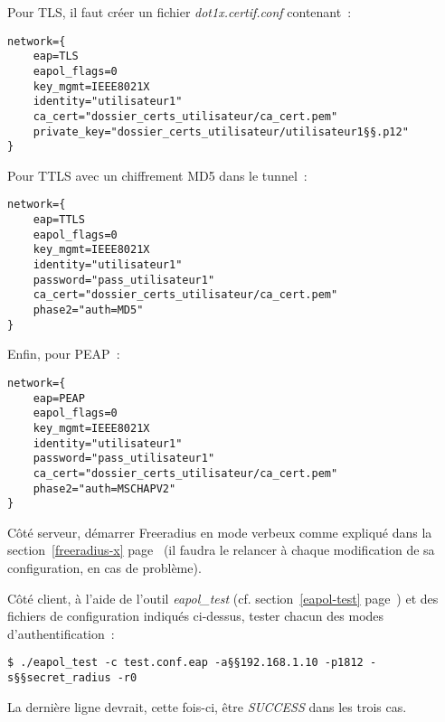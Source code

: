 Pour TLS, il faut créer un fichier \emph{dot1x.certif.conf} contenant~:

\begin{lstlisting}
network={
    eap=TLS
    eapol_flags=0
    key_mgmt=IEEE8021X
    identity="utilisateur1"
    ca_cert="dossier_certs_utilisateur/ca_cert.pem"
    private_key="dossier_certs_utilisateur/utilisateur1§§.p12"
}
\end{lstlisting}

%

Pour TTLS avec un chiffrement MD5 dans le tunnel~:

\begin{lstlisting}
network={
    eap=TTLS
    eapol_flags=0
    key_mgmt=IEEE8021X
    identity="utilisateur1"
    password="pass_utilisateur1"
    ca_cert="dossier_certs_utilisateur/ca_cert.pem"
    phase2="auth=MD5"
}
\end{lstlisting}

Enfin, pour PEAP~:

\begin{lstlisting}
network={
    eap=PEAP
    eapol_flags=0
    key_mgmt=IEEE8021X
    identity="utilisateur1"
    password="pass_utilisateur1"
    ca_cert="dossier_certs_utilisateur/ca_cert.pem"
    phase2="auth=MSCHAPV2"
}
\end{lstlisting}

Côté serveur, démarrer Freeradius en mode verbeux comme expliqué dans la section~\ref{freeradius-x} page~\pageref{freeradius-x} (il faudra le relancer à chaque modification de sa configuration, en cas de problème).

Côté client, à l'aide de l'outil \emph{eapol\_test} (cf. section~\ref{eapol-test} page~\pageref{eapol-test}) et des fichiers de configuration indiqués ci-dessus, tester chacun des modes d'authentification~:

\begin{lstlisting}
$ ./eapol_test -c test.conf.eap -a§§192.168.1.10 -p1812 -s§§secret_radius -r0
\end{lstlisting}

La dernière ligne devrait, cette fois-ci, être \emph{SUCCESS} dans les trois cas.
